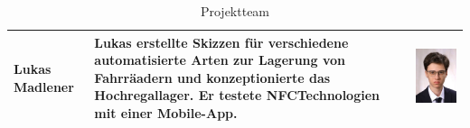 \begin{table}[H]
\begin{tabular}{lp{}c}
    Lukas Madlener & Lukas erstellte Skizzen für verschiedene automatisierte Arten zur Lagerung von Fahrräadern und konzeptionierte das Hochregallager. Er testete NFCTechnologien mit einer Mobile-App. & \begin{minipage}{.2\textwidth}\centering\includegraphics[width=\textwidth]{images/lukasmadlener.jpg}\end{minipage} \\
    \bottomrule
  \end{tabular}
  \caption{Projektteam}
  \label{tab:projektteam}
\end{table}

